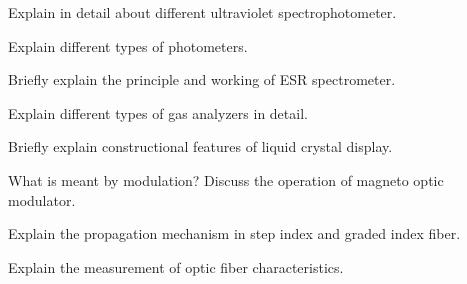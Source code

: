\markB
\partC


\item \iitem Explain in detail about different ultraviolet spectrophotometer.

\Or

\item Explain different types of photometers.

\ene

\item \iitem Briefly explain the principle and working of ESR spectrometer.

\Or

\item Explain different types of gas analyzers in detail.

\ene

\item \iitem Briefly explain constructional features of liquid crystal display.

\Or

\item What is meant by modulation? Discuss the operation of magneto optic modulator.

\ene

\item \iitem Explain the propagation mechanism in step index and graded index fiber.

\Or

\item Explain the measurement of optic fiber characteristics.

\ene

\markC
\ene
